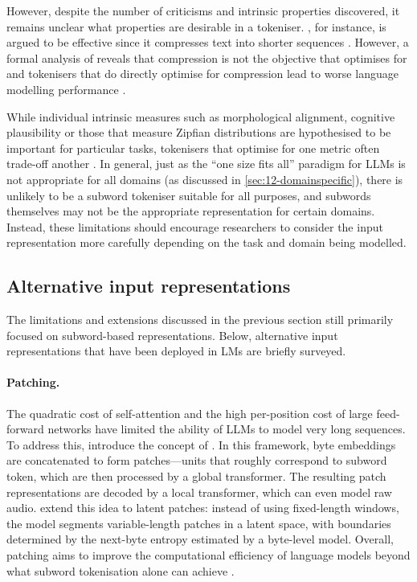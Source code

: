However, despite the number of criticisms and intrinsic properties discovered, it remains unclear what properties are desirable in a tokeniser. \bpe, for instance, is argued to be effective since it compresses text into shorter sequences \citep{galle2019investigating}. However, a formal analysis of \bpe reveals that compression is not the objective that \bpe optimises for \citep{zouhar2023formal} and tokenisers that do directly optimise for compression lead to worse language modelling performance \citep{schmidt2024tokenization}. 

While individual intrinsic measures such as morphological alignment, cognitive plausibility or those that measure Zipfian distributions are hypothesised to be important for particular tasks, tokenisers that optimise for one metric often trade-off another \citep{uzan-etal-2024-greed, lotz2025beyond}. In general, just as the ``one size fits all'' paradigm for LLMs is not appropriate for all domains (as discussed in \cref{sec:12-domainspecific}), there is unlikely to be a subword tokeniser suitable for all purposes, and subwords themselves may not be the appropriate representation for certain domains. Instead, these limitations should encourage researchers to consider the input representation more carefully depending on the task and domain being modelled.

\subsection{Alternative input representations}\label{sec:12-alternative}

The limitations and extensions discussed in the previous section still primarily focused on subword-based representations. Below, alternative input representations that have been deployed in LMs are briefly surveyed.

\paragraph{Patching.} The quadratic cost of self-attention and the high per-position cost of large feed-forward networks have limited the ability of LLMs to model very long sequences. To address this, \citet{yu2023megabyte} introduce the concept of . In this framework, byte embeddings are concatenated to form patches—units that roughly correspond to subword token, which are then processed by a global transformer. The resulting patch representations are decoded by a local transformer, which can even model raw audio. \citet{pagnoni2024byte} extend this idea to latent patches: instead of using fixed-length windows, the model segments variable-length patches in a latent space, with boundaries determined by the next-byte entropy estimated by a byte-level model. Overall, patching aims to improve the computational efficiency of language models beyond what subword tokenisation alone can achieve \citep{shao2025beyond}.

